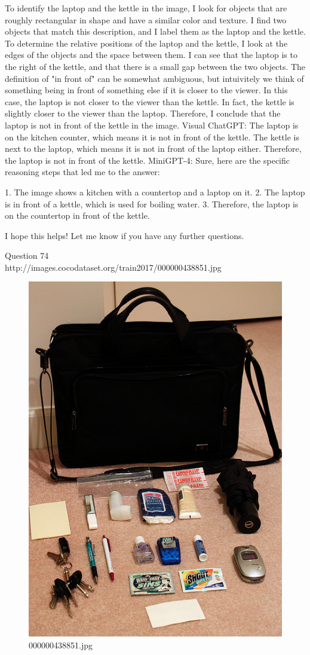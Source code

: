 \begin{enumerate}
    To identify the laptop and the kettle in the image, I look for objects that are roughly rectangular in shape and have a similar color and texture. I find two objects that match this description, and I label them as the laptop and the kettle.
    To determine the relative positions of the laptop and the kettle, I look at the edges of the objects and the space between them. I can see that the laptop is to the right of the kettle, and that there is a small gap between the two objects.
    The definition of "in front of" can be somewhat ambiguous, but intuivitely we think of something being in front of something else if it is closer to the viewer. In this case, the laptop is not closer to the viewer than the kettle. In fact, the kettle is slightly closer to the viewer than the laptop.
    Therefore, I conclude that the laptop is not in front of the kettle in the image.
    \subitem Visual ChatGPT: The laptop is on the kitchen counter, which means it is not in front of the kettle. The kettle is next to the laptop, which means it is not in front of the laptop either. Therefore, the laptop is not in front of the kettle.
    \subitem MiniGPT-4: Sure, here are the specific reasoning steps that led me to the answer:

    1. The image shows a kitchen with a countertop and a laptop on it.
    2. The laptop is in front of a kettle, which is used for boiling water.
    3. Therefore, the laptop is on the countertop in front of the kettle.
    
    I hope this helps! Let me know if you have any further questions.
\end{enumerate}
Question 74\\
http://images.cocodataset.org/train2017/000000438851.jpg
\begin{figure}[h]
    \centering
    \includegraphics[width=0.8\linewidth]{../image set/hard/000000438851.jpg}
    \caption{000000438851.jpg}
\end{figure}
